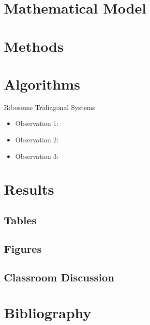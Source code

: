 \section{Mathematical Model}

\section{Methods}

\section{Algorithms}

\begin{algorithm}[H]
	\begin{algorithmic}[1]
	\end{algorithmic}
\caption{Ribosome Tridiagonal Systems}
\label{RibosomeTRIDS_1}
\end{algorithm}
\begin{itemize}
	\item Observation 1: \\
	\item Observation 2:  \\
	\item Observation 3:  \\
\end{itemize}	

\section{Results}

\subsection{Tables}

\subsection{Figures}

\subsection{Classroom Discussion}

\section{Bibliography}


\begin{thebibliography}{00}

\end{thebibliography}


